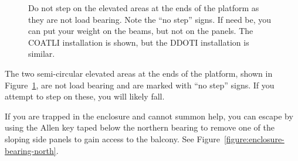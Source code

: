 \begin{figure}
\begin{center}
\end{center}
\caption{Do not step on the elevated areas at the ends of the platform as they are not load bearing. Note the “no step” signs. If need be, you can put your weight on the beams, but not on the panels.
\ifddoti
The COATLI installation is shown, but the DDOTI installation is similar.
\fi
}
\label{figure:enclosure-elevated}
\end{figure}

The two semi-circular elevated areas at the ends of the platform, shown in Figure~\ref{figure:enclosure-elevated}, are not load bearing and are marked with “no step” signs. If you attempt to step on these, you will likely fall.


If you are trapped in the enclosure and cannot summon help, you can escape by using the Allen key taped below the northern bearing to remove one of the sloping side panels to gain access to the balcony. See Figure~\ref{figure:enclosure-bearing-north}.

